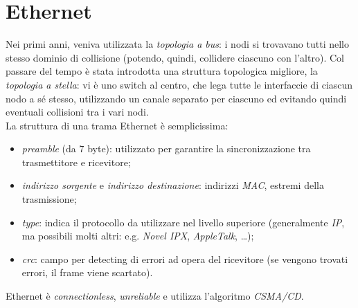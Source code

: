 \section{Ethernet}
Nei primi anni, veniva utilizzata la \textit{topologia a bus}: i nodi si trovavano tutti nello stesso dominio di collisione (potendo, quindi, collidere ciascuno con l'altro). Col passare del tempo è stata introdotta una struttura topologica migliore, la \textit{topologia a stella}: vi è uno switch al centro, che lega tutte le interfaccie di ciascun nodo a sé stesso, utilizzando un canale separato per ciascuno ed evitando quindi eventuali collisioni tra i vari nodi. \\
La struttura di una trama Ethernet è semplicissima:
\begin{itemize}
	\item \textit{preamble} (da 7 byte): utilizzato per garantire la sincronizzazione tra trasmettitore e ricevitore;
	\item \textit{indirizzo sorgente} e \textit{indirizzo destinazione}: indirizzi \textit{MAC}, estremi della trasmissione;
	\item \textit{type}: indica il protocollo da utilizzare nel livello superiore (generalmente \textit{IP}, ma possibili molti altri: e.g. \textit{Novel IPX}, \textit{AppleTalk}, \ldots);
	\item \textit{crc}: campo per detecting di errori ad opera del ricevitore (se vengono trovati errori, il frame viene scartato).
\end{itemize}
Ethernet è \textit{connectionless}, \textit{unreliable} e utilizza l'algoritmo \textit{CSMA/CD}.